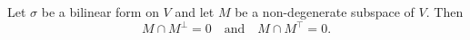 Let $\sigma$ be a bilinear form on $V$ and let $M$ be a non-degenerate subspace of $V$. Then
$$M \cap M^{\perp} = 0 \quad \text{and} \quad M \cap M^{\top} = 0.$$
